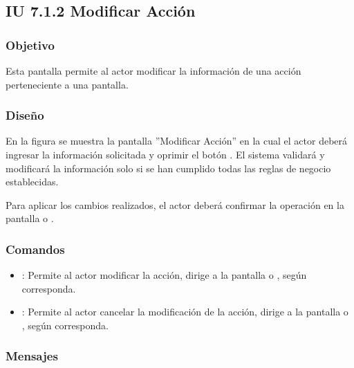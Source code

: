 \subsection{IU 7.1.2 Modificar Acción}

\subsubsection{Objetivo}
	Esta pantalla permite al actor modificar la información de una acción perteneciente a una pantalla.
\subsubsection{Diseño}
	En la figura  se muestra la pantalla ''Modificar Acción'' en la cual el actor deberá ingresar la información solicitada y oprimir el botón  . El sistema validará y modificará la información solo si se han cumplido todas las reglas de negocio establecidas.
	
	Para aplicar los cambios realizados, el actor deberá confirmar la operación en la pantalla  o .

\subsubsection{Comandos}
\begin{itemize}
	\item {}: Permite al actor modificar la acción, dirige a la pantalla  o , según corresponda.
	\item {}: Permite al actor cancelar la modificación de la acción, dirige a la pantalla  o , según corresponda.
\end{itemize}

\subsubsection{Mensajes}

